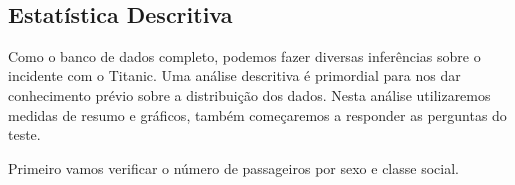 \documentclass[11pt]{article}
\begin{document}
    \begin{center}
    \end{center}
    { \hspace*{\fill} \\}
    
    \subsection{Estatística Descritiva}\label{estatuxedstica-descritiva}

    Como o banco de dados completo, podemos fazer diversas inferências sobre
o incidente com o Titanic. Uma análise descritiva é primordial para nos
dar conhecimento prévio sobre a distribuição dos dados. Nesta análise
utilizaremos medidas de resumo e gráficos, também começaremos a
responder as perguntas do teste.

Primeiro vamos verificar o número de passageiros por sexo e classe
social.
\end{document}
